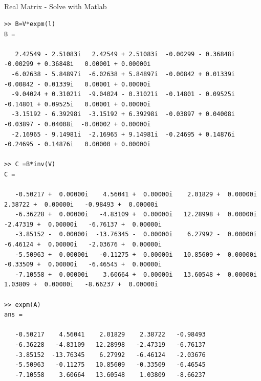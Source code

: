 \documentclass[xcolor=x11names,compress]{beamer}
\renewcommand{\(}{\begin{columns}}
\renewcommand{\)}{\end{columns}}
\newcommand{\<}[1]{\begin{column}{#1}}
\renewcommand{\>}{\end{column}}
\begin{document}
\subsection{}
\begin{frame}[fragile]{Real Matrix - Solve with Matlab}
\begin{tiny}
\begin{verbatim}
>> B=V*expm(l)
B =

   2.42549 - 2.51083i   2.42549 + 2.51083i  -0.00299 - 0.36848i  -0.00299 + 0.36848i   0.00001 + 0.00000i
  -6.02638 - 5.84897i  -6.02638 + 5.84897i  -0.00842 + 0.01339i  -0.00842 - 0.01339i   0.00001 + 0.00000i
  -9.04024 + 0.31021i  -9.04024 - 0.31021i  -0.14801 - 0.09525i  -0.14801 + 0.09525i   0.00001 + 0.00000i
  -3.15192 - 6.39298i  -3.15192 + 6.39298i  -0.03897 + 0.04008i  -0.03897 - 0.04008i  -0.00002 + 0.00000i
  -2.16965 - 9.14981i  -2.16965 + 9.14981i  -0.24695 + 0.14876i  -0.24695 - 0.14876i   0.00000 + 0.00000i

>> C =B*inv(V)
C =

   -0.50217 +  0.00000i    4.56041 +  0.00000i    2.01829 +  0.00000i    2.38722 +  0.00000i   -0.98493 +  0.00000i
   -6.36228 +  0.00000i   -4.83109 +  0.00000i   12.28998 +  0.00000i   -2.47319 +  0.00000i   -6.76137 +  0.00000i
   -3.85152 -  0.00000i  -13.76345 -  0.00000i    6.27992 -  0.00000i   -6.46124 +  0.00000i   -2.03676 +  0.00000i
   -5.50963 +  0.00000i   -0.11275 +  0.00000i   10.85609 +  0.00000i   -0.33509 +  0.00000i   -6.46545 +  0.00000i
   -7.10558 +  0.00000i    3.60664 +  0.00000i   13.60548 +  0.00000i    1.03809 +  0.00000i   -8.66237 +  0.00000i

>> expm(A)
ans =

   -0.50217    4.56041    2.01829    2.38722   -0.98493
   -6.36228   -4.83109   12.28998   -2.47319   -6.76137
   -3.85152  -13.76345    6.27992   -6.46124   -2.03676
   -5.50963   -0.11275   10.85609   -0.33509   -6.46545
   -7.10558    3.60664   13.60548    1.03809   -8.66237
\end{verbatim}
\end{tiny}
\end{frame}
\end{document}
